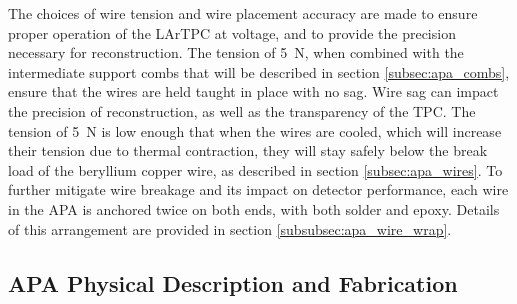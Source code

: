 The choices of wire tension and wire placement accuracy are made to ensure proper operation of the LArTPC at voltage, and to provide the precision necessary for reconstruction.  The tension of 5~N, when combined with the intermediate support combs that will be described in section \ref{subsec:apa_combs}, ensure that the wires are held taught in place with no sag.  Wire sag can impact the precision of reconstruction, as well as the transparency of the TPC.  The tension of 5~N is low enough that when the wires are cooled, which will increase their tension due to thermal contraction, they will stay safely below the break load of the beryllium copper wire, as described in section \ref{subsec:apa_wires}.  To further mitigate wire breakage and its impact on detector performance, each wire in the APA is anchored twice on both ends, with both solder and epoxy.  Details of this arrangement are provided in section \ref{subsubsec:apa_wire_wrap}. 







\subsection{APA Physical Description and Fabrication}
